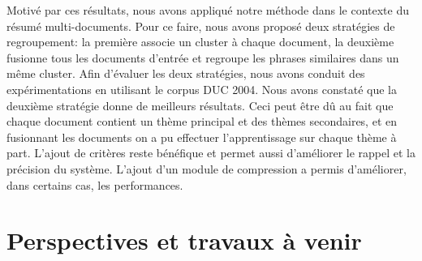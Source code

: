 \documentclass[a4paper,12pt,oneside]{../use/ESIthesis}
\begin{document}
Motivé par ces résultats, nous avons appliqué notre méthode dans le contexte du résumé multi-documents. 
Pour ce faire, nous avons proposé deux stratégies de regroupement: la première associe un cluster à chaque document, la deuxième fusionne tous les documents d'entrée et regroupe les phrases similaires dans un même cluster. 
Afin d'évaluer les deux stratégies, nous avons conduit des expérimentations en utilisant le corpus DUC 2004. 
Nous avons constaté que la deuxième stratégie donne de meilleurs résultats.
Ceci peut être dû au fait que chaque document contient un thème principal et des thèmes secondaires, et en fusionnant les documents on a pu effectuer l'apprentissage sur chaque thème à part. 
L'ajout de critères reste bénéfique et permet aussi d'améliorer le rappel et la précision du système.
L'ajout d'un module de compression a permis d'améliorer, dans certains cas, les performances.

\section*{Perspectives et travaux à venir}
\end{document}

